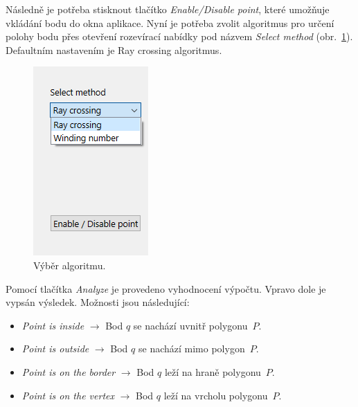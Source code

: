 \documentclass[a4paper, 12pt, oneside, titlepage]{article} %
\begin{document}
Následně je potřeba stisknout tlačítko \emph{Enable/Disable point}, které umožňuje vkládání bodu do okna aplikace. Nyní je potřeba zvolit algoritmus pro určení polohy bodu přes otevření rozevírací nabídky pod názvem \emph{Select method} (obr.~\ref{fig:select_met}). Defaultním nastavením je Ray crossing algoritmus.

\begin{figure}[!htb]
	\centering
	\includegraphics[scale=0.8]{obrazky/select_met.png} 
	\caption{Výběr algoritmu.
	}
	\label{fig:select_met}
\end{figure} 
\FloatBarrier

Pomocí tlačítka \emph{Analyze} je provedeno vyhodnocení výpočtu. Vpravo dole je vypsán výsledek. Možnosti jsou následující:
\begin{itemize}
\item \emph{Point is inside} $\longrightarrow$ Bod $q$ se nachází uvnitř polygonu~$P$.
\item \emph{Point is outside} $\longrightarrow$ Bod $q$ se nachází mimo polygon~$P$.
\item \emph{Point is on the border} $\longrightarrow$ Bod $q$ leží na hraně polygonu~$P$.
\item \emph{Point is on the vertex} $\longrightarrow$ Bod $q$ leží na vrcholu polygonu~$P$.
\end{itemize}
\end{document}
